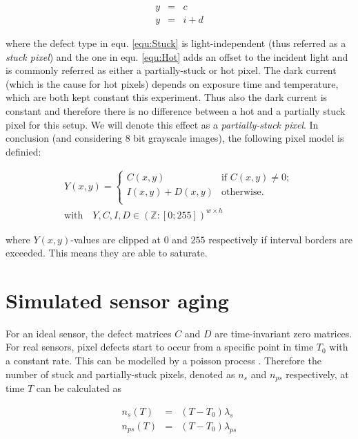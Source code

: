 \documentclass[10pt,twocolumn,letterpaper]{article}
\begin{document}
\begin{eqnarray}
  y & = & c \label{equ:Stuck} \\
  y & = & i + d \label{equ:Hot}
\end{eqnarray}
  
where the defect type in equ. \ref{equ:Stuck} is light-independent (thus referred as a \emph{stuck pixel}) and the one in equ. \ref{equ:Hot} adds an offset to the incident light and is commonly referred as either a partially-stuck or hot pixel. The dark current (which is the cause for hot pixels) depends on exposure time and temperature, which are both kept constant this experiment. Thus also the dark current is constant and therefore there is no difference between a hot and a partially stuck pixel for this setup. We will denote this effect as a \emph{partially-stuck pixel}. In conclusion (and considering 8 bit grayscale images), the following pixel model is definied:

\begin{equation}
\begin{aligned}
Y({x,y}) = \begin{cases}
C({x,y})  & \text{if $C({x,y}) \neq 0$}; \\
I({x,y}) +D({x,y})  & \text{otherwise}.\\
\end{cases} \\ \text{with} \quad Y,C,I,D \in {(\mathbb{Z}:[0;255])}^{w \times h}
\label{equ:finalPixelModel}
\end{aligned} 
\end{equation}

where $Y({x,y})$-values are clipped at $0$ and $255$ respectively if interval borders are exceeded. This means they are able to saturate. 

\section{Simulated sensor aging}
\label{virtualAging}
For an ideal sensor, the defect matrices $C$ and $D$ are time-invariant zero matrices. For real sensors, pixel defects start to occur from a specific point in time $T_0$ with a constant rate. This can be modelled by a poisson process \cite{fridrich}. Therefore the number of stuck and partially-stuck pixels, denoted as $n_{s}$ and $n_{ps}$ respectively, at time $T$ can be calculated as

\begin{eqnarray}
   n_s(T)  & = & (T-T_0) \lambda_s \\
  n_{ps}(T) & = &  (T-T_0) \lambda_{ps}
\end{eqnarray}
\end{document}
